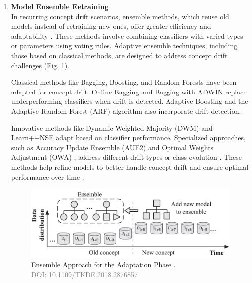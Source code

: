 \begin{enumerate}[label=\Alph*.]
\item \textbf{Model Ensemble Eetraining} \\
In recurring concept drift scenarios, ensemble methods, which reuse old models instead of retraining new ones, offer greater efficiency and adaptability \cite{sun2018concept}. These methods involve combining classifiers with varied types or parameters using voting rules. Adaptive ensemble techniques, including those based on classical methods, are designed to address concept drift challenges (Fig. \ref{fig:concept-drift-ensemble}).

Classical methods like Bagging, Boosting, and Random Forests have been adapted for concept drift. Online Bagging \cite{oza2001experimental} and Bagging with ADWIN \cite{bifet2009new} replace underperforming classifiers when drift is detected. Adaptive Boosting \cite{chu2004fast} and the Adaptive Random Forest (ARF) algorithm \cite{gomes2017adaptive} also incorporate drift detection.

Innovative methods like Dynamic Weighted Majority (DWM) \cite{kolter2007dynamic} and Learn++NSE \cite{elwell2011incremental} adapt based on classifier performance. Specialized approaches, such as Accuracy Update Ensemble (AUE2) \cite{brzezinski2013reacting} and Optimal Weights Adjustment (OWA) \cite{zhang2008categorizing}, address different drift types or class evolution \cite{sun2016online}. These methods help refine models to better handle concept drift and ensure optimal performance over time \cite{ahmadi2018modeling, gama2014survey}.
 
 \begin{figure}[!ht]
    \centering
    \includegraphics[width=.9\textwidth]{2_Background/figures/ensemble_update.png}
    \caption{Ensemble Approach for the Adaptation Phase \cite{8496795}. \\ \textcolor{gray}{\fontsize{10}{0}\selectfont DOI: 10.1109/TKDE.2018.2876857}}
    \label{fig:concept-drift-ensemble}
\end{figure}





\end{enumerate}
